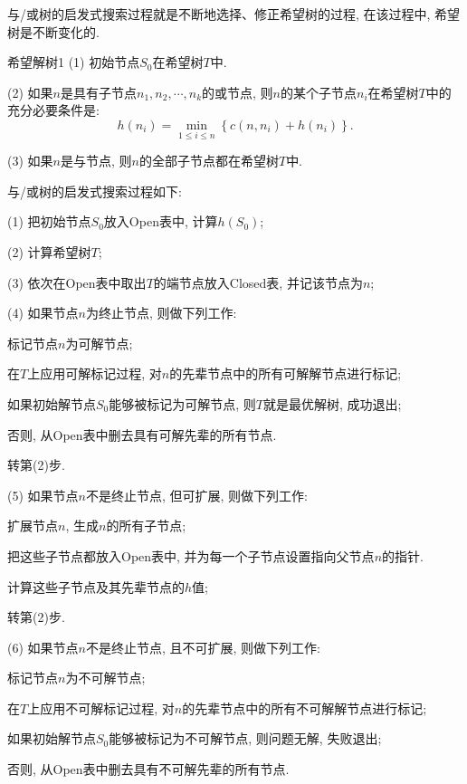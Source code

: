 与/或树的启发式搜索过程就是不断地选择、修正希望树的过程, 在该过程中, 希望树是不断变化的.
\begin{mydef}{希望解树}{1}
(1) 初始节点$S_0$在希望树$T$中.

(2) 如果$n$是具有子节点$n_1, n_2, \cdots, n_k$的或节点, 则$n$的某个子节点$n_i$在希望树$T$中的充分必要条件是:
     $$h\left(n_{i}\right)=\min _{1 \leq i \leq n}\left\{c\left(n, n_{i}\right)+h\left(n_{i}\right)\right\}.$$

(3) 如果$n$是与节点, 则$n$的全部子节点都在希望树$T$中.
\end{mydef}

与/或树的启发式搜索过程如下:

(1) 把初始节点$S_0$放入Open表中, 计算$h(S_0)$;

(2) 计算希望树$T$;

(3) 依次在Open表中取出$T$的端节点放入Closed表, 并记该节点为$n$;

(4) 如果节点$n$为终止节点, 则做下列工作:

  \qquad   {} 标记节点$n$为可解节点;

  \qquad    {} 在$T$上应用可解标记过程, 对$n$的先辈节点中的所有可解解节点进行标记;

  \qquad    {} 如果初始解节点$S_0$能够被标记为可解节点, 则$T$就是最优解树, 成功退出;

  \qquad    {} 否则, 从Open表中删去具有可解先辈的所有节点.

  \qquad    {} 转第(2)步.

(5) 如果节点$n$不是终止节点, 但可扩展, 则做下列工作:

  \qquad    {} 扩展节点$n$, 生成$n$的所有子节点;

  \qquad    {} 把这些子节点都放入Open表中, 并为每一个子节点设置指向父节点$n$的指针.

  \qquad    {} 计算这些子节点及其先辈节点的$h$值;

  \qquad    {} 转第(2)步.

(6) 如果节点$n$不是终止节点, 且不可扩展, 则做下列工作:

   \qquad   {} 标记节点$n$为不可解节点;

   \qquad   {} 在$T$上应用不可解标记过程, 对$n$的先辈节点中的所有不可解解节点进行标记;

   \qquad   {} 如果初始解节点$S_0$能够被标记为不可解节点, 则问题无解, 失败退出;

   \qquad   {} 否则, 从Open表中删去具有不可解先辈的所有节点.


